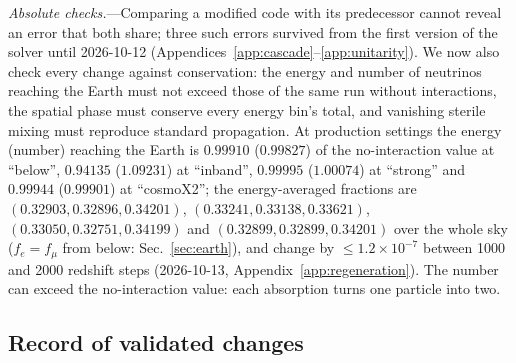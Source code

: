 \documentclass[11pt,a4paper]{article}
\begin{document}
\textit{Absolute checks.}---Comparing a modified code with its predecessor cannot reveal an
error that both share; three such errors survived from the first version of the solver until
2026-10-12 (Appendices~\ref{app:cascade}--\ref{app:unitarity}). We now also check every change
against conservation: the energy and number of neutrinos reaching the Earth must not exceed
those of the same run without interactions, the spatial phase must conserve every energy bin's
total, and vanishing sterile mixing must reproduce standard propagation. At production settings
the energy (number) reaching the Earth is $0.99910$ ($0.99827$) of the no-interaction value at
``below'', $0.94135$ ($1.09231$) at ``inband'', $0.99995$ ($1.00074$) at ``strong'' and
$0.99944$ ($0.99901$) at ``cosmoX2''; the energy-averaged fractions are
$(0.32903, 0.32896, 0.34201)$, $(0.33241, 0.33138, 0.33621)$, $(0.33050, 0.32751, 0.34199)$
and $(0.32899, 0.32899, 0.34201)$ over the whole sky ($f_e = f_\mu$ from below: Sec.~\ref{sec:earth}),
and change by $\le1.2\times10^{-7}$ between 1000 and 2000 redshift steps (2026-10-13,
Appendix~\ref{app:regeneration}). The number can exceed the
no-interaction value: each absorption turns one particle into two.

\subsection{Record of validated changes}
\end{document}
